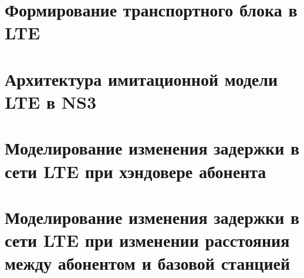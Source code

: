\appendix
\chapter{Формирование транспортного блока в LTE} \label{AppendixLTEblock}

\clearpage
\chapter{Архитектура имитационной модели LTE в NS3} \label{AppendixNS3}

\clearpage
\chapter{Моделирование изменения задержки в сети LTE при хэндовере абонента} \label{AppendixHandover}
%
\clearpage
\chapter{Моделирование изменения задержки в сети LTE при изменении расстояния между абонентом и базовой станцией} \label{AppendixDistanse}
%
\clearpage


